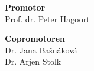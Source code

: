 {\setlength{\parindent}{0cm}\raggedright%

\newpage

\hspace{-12pt}\textbf{Promotor}\\
Prof. dr. Peter Hagoort
\vspace{12pt}

\hspace{-12pt}\textbf{Copromotoren}\\
Dr. Jana Ba\v{s}n\'{a}kov\'{a} \\
Dr. Arjen Stolk
\vspace{20pt}




\vfill
}



\thispagestyle{empty}

{\setlength{\parindent}{0cm}
\begin{flushright}
\end{flushright}
}

